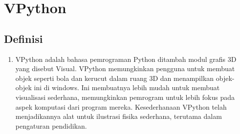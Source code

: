 

\section{VPython}
\subsection{Definisi}
		\begin{enumerate}
			\item VPython adalah bahasa pemrograman Python ditambah modul grafis 3D yang disebut Visual. VPython memungkinkan pengguna untuk membuat objek seperti bola dan kerucut dalam ruang 3D dan menampilkan objek-objek ini di windows. Ini membuatnya lebih mudah untuk membuat visualisasi sederhana, memungkinkan pemrogram untuk lebih fokus pada aspek komputasi dari program mereka. Kesederhanaan VPython telah menjadikannya alat untuk ilustrasi fisika sederhana, terutama dalam pengaturan pendidikan.
		\end{enumerate}
